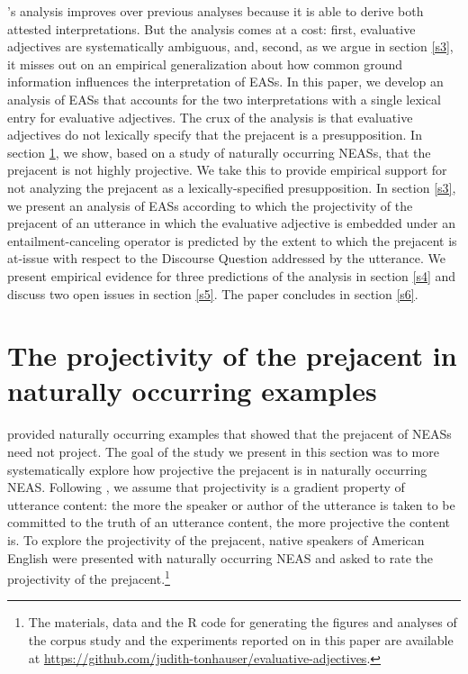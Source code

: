 \documentclass[11pt,fleqn]{article}
\newcommand{\6}{\mbox{$[\hspace*{-.6mm}[$}}
\newcommand{\9}{\mbox{$]\hspace*{-.6mm}]$}}
\newcommand{\citepos}[1]{\citeauthor{#1}'s \citeyear{#1}}
\begin{document}
\citepos{karttunen-etal2014} analysis improves over previous analyses because it is able to derive both attested interpretations. But the analysis comes at a cost: first, evaluative adjectives are systematically ambiguous, and, second, as we argue in section \ref{s3}, it misses out on an empirical generalization about how common ground information  influences the interpretation of EASs. In this paper, we develop an analysis of EASs that accounts for the two interpretations with a single lexical entry for evaluative adjectives. The crux of the analysis is that evaluative adjectives do not lexically specify that the prejacent is a presupposition. In section \ref{s2}, we show, based on a study of naturally occurring NEASs, that the prejacent is not highly projective. We take this to provide empirical support for not analyzing the prejacent as a lexically-specified presupposition. In section \ref{s3}, we present an analysis of EASs according to which the projectivity of the prejacent of an utterance in which the evaluative adjective is embedded under an entailment-canceling operator is predicted by the extent to which the prejacent is at-issue with respect to the Discourse Question addressed by the utterance. We present empirical evidence for three predictions of the analysis in section \ref{s4} and discuss two open issues in section \ref{s5}. The paper concludes in section \ref{s6}.

\section{The projectivity of the prejacent in naturally occurring examples}\label{s2}

\citet{karttunen-etal2014} provided naturally occurring examples that showed that the prejacent of NEASs need not project. The goal of the study we present in this section was to more systematically explore how projective the prejacent is in naturally occurring NEAS. Following \citealt{tbd-variability}, we assume that projectivity is a gradient property of utterance content: the more the speaker or author of the utterance is taken to be committed to the truth of an utterance content, the more projective the content is. To explore the projectivity of the prejacent, native speakers of American English were presented with naturally occurring NEAS and asked to rate the projectivity of the prejacent.\footnote{\label{f-git}The
materials, data and the R code for generating the figures and analyses
of the corpus study and the experiments reported on in this paper are available at
\url{https://github.com/judith-tonhauser/evaluative-adjectives}.} 
\end{document}

